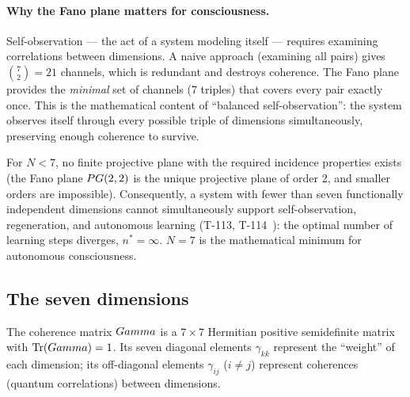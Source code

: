 \paragraph{Why the Fano plane matters for consciousness.}
Self-observation --- the act of a system modeling itself --- requires examining correlations
between dimensions. A naive approach (examining all pairs) gives $\binom{7}{2} = 21$
channels, which is redundant and destroys coherence. The Fano plane provides the
\emph{minimal} set of channels (7 triples) that covers every pair exactly once. This is
the mathematical content of ``balanced self-observation'': the system observes itself
through every possible triple of dimensions simultaneously, preserving enough coherence
to survive.

\begin{theorem}
For $N < 7$, no finite projective plane with the required incidence properties exists
(the Fano plane $PG(2,2)$ is the unique projective plane of order 2, and smaller orders
are impossible). Consequently, a system with fewer than seven functionally independent
dimensions cannot simultaneously support self-observation, regeneration, and autonomous
learning (T-113, T-114~): the optimal number of learning steps diverges,
$n^\ast = \infty$. $N = 7$ is the mathematical minimum for autonomous consciousness.
\end{theorem}

\subsection{The seven dimensions}
\label{subsec:seven-dimensions}

The coherence matrix $Gamma$ is a $7 \times 7$ Hermitian positive semidefinite matrix with
$\Tr(Gamma) = 1$. Its seven diagonal elements $\gamma_{kk}$ represent the ``weight'' of
each dimension; its off-diagonal elements $\gamma_{ij}$ ($i \neq j$) represent coherences
(quantum correlations) between dimensions.

